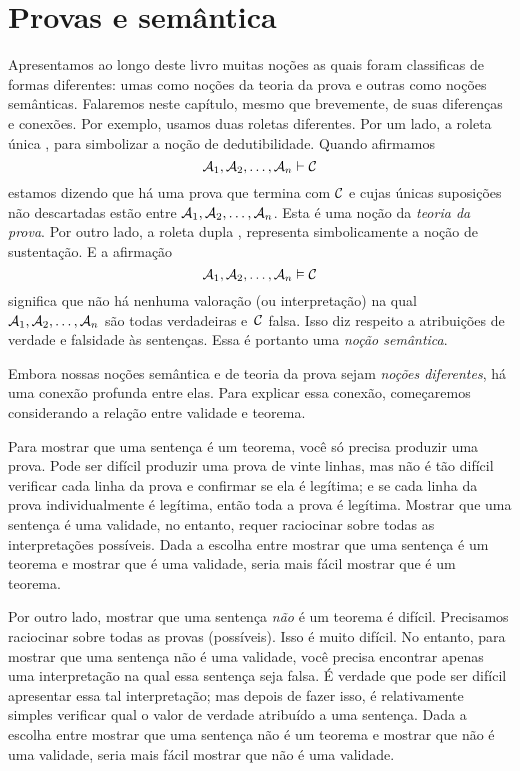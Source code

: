 
\chapter{Provas e sem\^antica}

Apresentamos ao longo deste livro muitas no\c c\~oes as quais foram classificas de formas diferentes: umas como no\c c\~oes da teoria da prova e outras como  no\c c\~oes sem\^anticas.  Falaremos neste cap\'itulo, mesmo que brevemente, de suas diferen\c cas  e conex\~oes. 
Por exemplo, usamos duas roletas diferentes.  Por um lado, a roleta \'unica  \proves,  para simbolizar a no\c c\~ao de dedutibilidade. Quando afirmamos 
$$\mathcal{A}_1, \mathcal{A}_2, \ldots, \mathcal{A}_n \vdash \mathcal{C}$$
estamos dizendo que h\'a uma prova que termina com $\mathcal{C}$ e cujas \'unicas suposi\c c\~oes n\~ao descartadas est\~ao entre  $\mathcal{A}_1, \mathcal{A}_2, \ldots, \mathcal{A}_n$. Esta \'e uma no\c c\~ao da \emph{teoria da prova}.   Por outro lado,  a roleta  dupla  \entails, representa simbolicamente a no\c c\~ao de sustenta\c c\~ao. E a afirma\c c\~ao 
$$\mathcal{A}_1, \mathcal{A}_2, \ldots, \mathcal{A}_n \vDash \mathcal{C}$$
significa que n\~ao h\'a nenhuma valora\c c\~ao (ou interpreta\c c\~ao) na qual  $\mathcal{A}_1, \mathcal{A}_2, \ldots, \mathcal{A}_n$ s\~ao todas verdadeiras e~$\mathcal{C}$ falsa. Isso diz respeito a atribui\c c\~oes de verdade e falsidade \`as senten\c cas. Essa \'e portanto uma \emph{no\c c\~ao sem\^antica}.

Embora nossas no\c c\~oes sem\^antica e de teoria da prova sejam \emph{no\c c\~oes diferentes}, h\'a uma conex\~ao profunda entre elas. Para explicar essa conex\~ao, come\c caremos considerando a rela\c c\~ao entre validade  e teorema.

Para mostrar que uma senten\c ca \'e um teorema, voc\^e s\'o precisa produzir uma prova. Pode ser dif\'icil produzir uma prova de vinte linhas, mas n\~ao \'e t\~ao dif\'icil verificar cada linha da prova e confirmar se ela \'e leg\'itima; e se cada linha da prova individualmente \'e leg\'itima, ent\~ao toda a prova \'e leg\'itima. Mostrar que uma senten\c ca \'e uma validade, no entanto, requer raciocinar sobre todas as interpreta\c c\~oes poss\'iveis. Dada a escolha entre mostrar que uma senten\c ca \'e um teorema e mostrar que \'e uma validade, seria mais f\'acil mostrar que \'e um teorema.

Por outro lado, mostrar que uma senten\c ca \emph{n\~ao} \'e um teorema \'e dif\'icil. Precisamos raciocinar sobre todas as provas (poss\'iveis). Isso \'e muito dif\'icil. No entanto, para mostrar que uma senten\c ca n\~ao \'e uma validade, voc\^e precisa encontrar apenas uma interpreta\c c\~ao na qual essa senten\c ca seja falsa. \'E verdade que pode ser dif\'icil apresentar essa tal interpreta\c c\~ao; mas depois de fazer isso, \'e relativamente simples verificar qual o valor de verdade atribu\'ido a uma senten\c ca. Dada a escolha entre mostrar que uma senten\c ca n\~ao \'e um teorema e mostrar que n\~ao \'e uma validade, seria mais f\'acil mostrar que n\~ao \'e uma validade.

